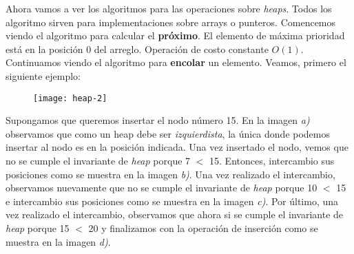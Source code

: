 \documentclass[10pt,a4paper]{article}
\begin{document}
Ahora vamos a ver los algoritmos para las operaciones sobre \textit{heaps}. Todos los algoritmo sirven para implementaciones sobre arrays o punteros. 
\newline
\newline
Comencemos viendo el algoritmo para calcular el \textbf{próximo}.
\newline
\newline
El elemento de máxima prioridad está en la posición 0 del arreglo.
\newline
\newline
Operación de costo constante $O(1)$.
\newline
\newline
Continuamos viendo el algoritmo para \textbf{encolar} un elemento.
\newline
\newline
Veamos, primero el siguiente ejemplo:
\newline
\begin{figure}[h]
	\centering
\texttt{[image: heap-2]}
	\label{drivers1}
\end{figure}
\newline
\newline
Supongamos que queremos insertar el nodo número 15.
\newline
\newline
En la imagen \textit{a)} observamos que como un heap debe ser \textit{izquierdista}, la única donde podemos insertar al nodo es en la posición indicada.
\newline
\newline
Una vez insertado el nodo, vemos que no se cumple el invariante de \textit{heap} porque 7 $<$ 15. Entonces, intercambio sus posiciones como se muestra en la imagen \textit{b)}.
\newline
\newline
Una vez realizado el intercambio, observamos nuevamente que no se cumple el invariante de \textit{heap} porque 10 $<$ 15 e intercambio sus posiciones como se muestra en la imagen \textit{c)}. 
\newline
\newline
Por último, una vez realizado el intercambio, observamos que ahora si se cumple el invariante de \textit{heap} porque 15 $<$ 20 y finalizamos con la operación de inserción como se muestra en la imagen \textit{d)}. 
\newline
\newline
\newline
\newline
\end{document}
